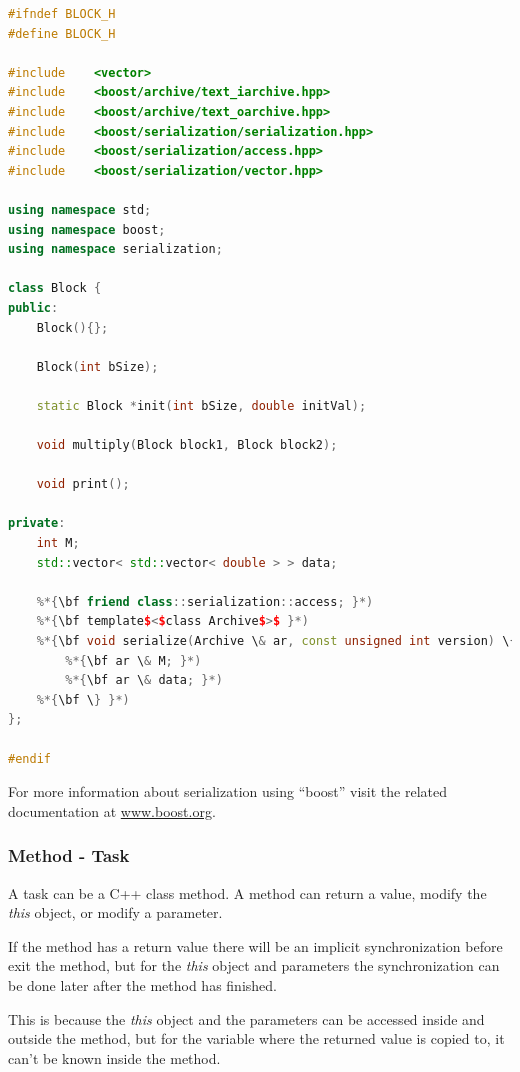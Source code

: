 \begin{lstlisting}[language=C++]
#ifndef BLOCK_H
#define BLOCK_H

#include    <vector>
#include    <boost/archive/text_iarchive.hpp>
#include    <boost/archive/text_oarchive.hpp>
#include    <boost/serialization/serialization.hpp>
#include    <boost/serialization/access.hpp>
#include    <boost/serialization/vector.hpp>

using namespace std;
using namespace boost;
using namespace serialization;

class Block {
public:
    Block(){};

    Block(int bSize);
       
    static Block *init(int bSize, double initVal);
        
    void multiply(Block block1, Block block2);
        
    void print();

private:
    int M;
    std::vector< std::vector< double > > data;
        
    %*{\bf friend class::serialization::access; }*)
    %*{\bf template$<$class Archive$>$ }*)
    %*{\bf void serialize(Archive \& ar, const unsigned int version) \{ }*)
        %*{\bf ar \& M; }*)
        %*{\bf ar \& data; }*)
    %*{\bf \} }*)
};

#endif
\end{lstlisting}

For more information about serialization using ``boost'' visit the related documentation at \url{www.boost.org}.


\subsubsection{Method - Task}

A task can be a C++ class method. A method can return a value, modify the \textit{this} object, or modify a parameter.

If the method has a return value there will be an implicit synchronization before exit the method, 
but for the \textit{this} object and parameters the synchronization can be done later after the method has finished.

This is because the \textit{this} object and the parameters can be accessed inside and outside the method, but for the 
variable where the returned value is copied to, it can’t be known inside the method.

